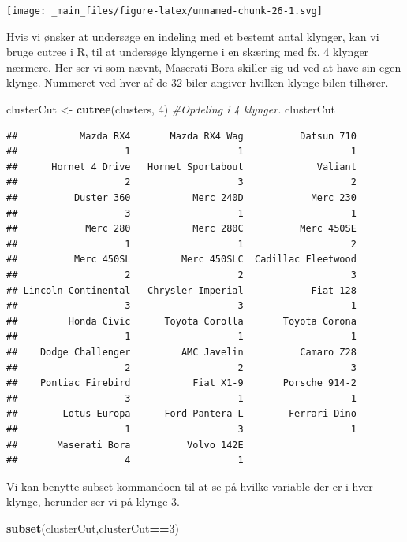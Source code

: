\documentclass[]{book}
\newenvironment{Shaded}{\begin{snugshade}}{\end{snugshade}}
\newcommand{\CommentTok}[1]{\textcolor[rgb]{0.56,0.35,0.01}{\textit{#1}}}
\newcommand{\DecValTok}[1]{\textcolor[rgb]{0.00,0.00,0.81}{#1}}
\newcommand{\KeywordTok}[1]{\textcolor[rgb]{0.13,0.29,0.53}{\textbf{#1}}}
\newcommand{\NormalTok}[1]{#1}
\newcommand{\OperatorTok}[1]{\textcolor[rgb]{0.81,0.36,0.00}{\textbf{#1}}}
\newcommand{\StringTok}[1]{\textcolor[rgb]{0.31,0.60,0.02}{#1}}
\begin{document}
\texttt{[image: \_main\_files/figure-latex/unnamed-chunk-26-1.svg]}

Hvis vi ønsker at undersøge en indeling med et bestemt antal klynger, kan vi bruge cutree i R, til at undersøge klyngerne i en skæring med fx. 4 klynger nærmere. Her ser vi som nævnt, Maserati Bora skiller sig ud ved at have sin egen klynge. Nummeret ved hver af de 32 biler angiver hvilken klynge bilen tilhører.

\begin{Shaded}
\begin{Highlighting}[]
\NormalTok{clusterCut <-}\StringTok{ }\KeywordTok{cutree}\NormalTok{(clusters, }\DecValTok{4}\NormalTok{) }\CommentTok{#Opdeling i 4 klynger.}
\NormalTok{clusterCut}
\end{Highlighting}
\end{Shaded}

\begin{verbatim}
##           Mazda RX4       Mazda RX4 Wag          Datsun 710 
##                   1                   1                   1 
##      Hornet 4 Drive   Hornet Sportabout             Valiant 
##                   2                   3                   2 
##          Duster 360           Merc 240D            Merc 230 
##                   3                   1                   1 
##            Merc 280           Merc 280C          Merc 450SE 
##                   1                   1                   2 
##          Merc 450SL         Merc 450SLC  Cadillac Fleetwood 
##                   2                   2                   3 
## Lincoln Continental   Chrysler Imperial            Fiat 128 
##                   3                   3                   1 
##         Honda Civic      Toyota Corolla       Toyota Corona 
##                   1                   1                   1 
##    Dodge Challenger         AMC Javelin          Camaro Z28 
##                   2                   2                   3 
##    Pontiac Firebird           Fiat X1-9       Porsche 914-2 
##                   3                   1                   1 
##        Lotus Europa      Ford Pantera L        Ferrari Dino 
##                   1                   3                   1 
##       Maserati Bora          Volvo 142E 
##                   4                   1
\end{verbatim}

Vi kan benytte subset kommandoen til at se på hvilke variable der er i hver klynge, herunder ser vi på klynge 3.

\begin{Shaded}
\begin{Highlighting}[]
\KeywordTok{subset}\NormalTok{(clusterCut,clusterCut}\OperatorTok{==}\DecValTok{3}\NormalTok{)}
\end{Highlighting}
\end{Shaded}
\end{document}
